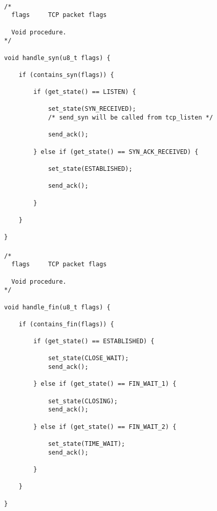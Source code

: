 \documentclass[11pt]{article}
\begin{document}
\paragraph{}


\begin{lstlisting}[title=Procedure handle\_syn]
/*
  flags     TCP packet flags

  Void procedure.
*/

void handle_syn(u8_t flags) {

    if (contains_syn(flags)) {

        if (get_state() == LISTEN) {

            set_state(SYN_RECEIVED);
            /* send_syn will be called from tcp_listen */

            send_ack();

        } else if (get_state() == SYN_ACK_RECEIVED) {

            set_state(ESTABLISHED);

            send_ack();

        }

    }

}
\end{lstlisting}


\paragraph{}


\begin{lstlisting}[title=Procedure handle\_fin]
/*
  flags     TCP packet flags

  Void procedure.
*/

void handle_fin(u8_t flags) {

    if (contains_fin(flags)) {

        if (get_state() == ESTABLISHED) {

            set_state(CLOSE_WAIT);
            send_ack();

        } else if (get_state() == FIN_WAIT_1) {

            set_state(CLOSING);
            send_ack();

        } else if (get_state() == FIN_WAIT_2) {

            set_state(TIME_WAIT);
            send_ack();

        }

    }

}
\end{lstlisting}
\end{document}
